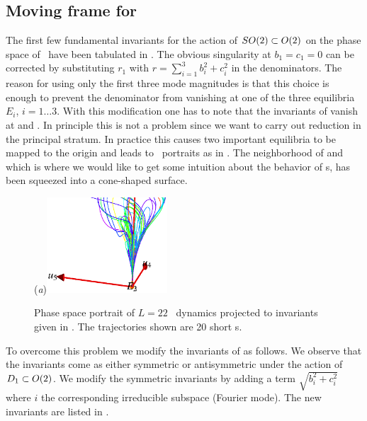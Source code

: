 \subsection{Moving frame for \KSe}

The first few fundamental invariants for the action  of $SO(2)\subset O(2)$ on the phase space of \KSe\ have been tabulated in . The obvious singularity at $b_1=c_1=0$ can be
corrected by substituting $r_1$ with $r=\sum_{i=1}^3 b_i^2+c_i^2$ in the denominators. The reason
for using only the first three mode magnitudes is that this choice is enough to prevent the denominator from vanishing at one of the three equilibria $E_i$, $i=1\ldots3$. With this modification one has to note that the invariants of  vanish at  and . In principle this is not a problem since we want to carry out reduction in the principal stratum. In practice this causes two important equilibria to be mapped to the origin and leads to \statesp\ portraits as in . The neighborhood of  and  which is where we would like to get some intuition about the behavior of \rpo s, has been squeezed into a cone-shaped surface.

\begin{figure}[t]
\begin{center}
  (\textit{a})\includegraphics[width=0.4\textwidth]{../figs/ksSO2inv145eqbTo0.eps}
\end{center}
\caption[KSe SO(2) reduced phase space with modified invariants.]{ Phase space portrait of $L=22$ \KS\ dynamics projected to invariants given in . The trajectories shown are 20 short \rpo s.
   }
\label{fig:ksSO2eqbTo0}
\end{figure}

To overcome this problem we modify the invariants of   as follows. We observe that the invariants come as either symmetric or antisymmetric under the action of $D_{1}\subset O(2)$. We modify the symmetric invariants by adding a term $\sqrt{b_i^2+c_i^2}$ where $i$ the corresponding irreducible subspace  (Fourier mode). The new invariants are listed in .

